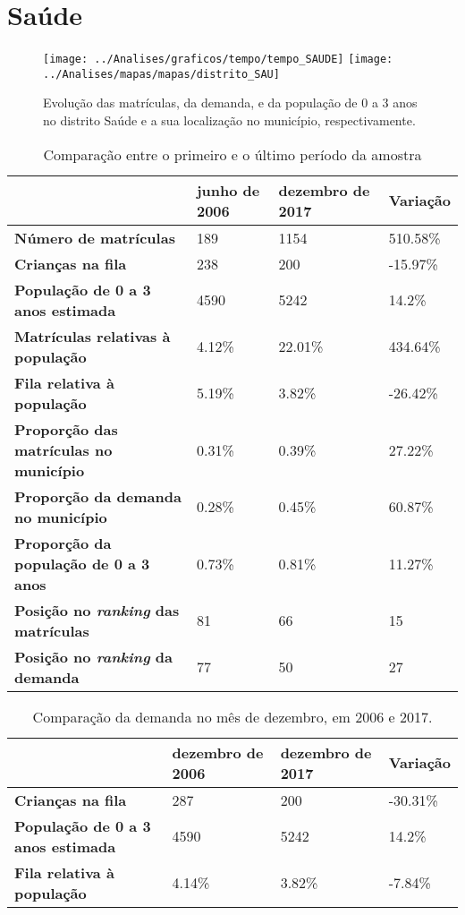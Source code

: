 \section{Saúde}
\begin{figure}[H]
\centering
\texttt{[image: ../Analises/graficos/tempo/tempo\_SAUDE]}
\texttt{[image: ../Analises/mapas/mapas/distrito\_SAU]}
\caption{Evolução das matrículas, da demanda, e da população de 0 a 3 anos no distrito Saúde e a sua localização no município, respectivamente.}
\end{figure}
\begin{table}[H]
\begin{tabular}{l|l|l|l}
\textbf{}                                      & \textbf{junho de 2006}       & \textbf{dezembro de 2017}    & \textbf{Variação} \\ \hline
\textbf{Número de matrículas}                  & 189 & 1154 & 510.58\% \\ \hline
\textbf{Crianças na fila}                      & 238 & 200 & -15.97\% \\ \hline
\textbf{População de 0 a 3 anos estimada}      & 4590 & 5242 & 14.2\% \\ \hline
\textbf{Matrículas relativas à população}      & 4.12\% & 22.01\% & 434.64\% \\ \hline
\textbf{Fila relativa à população}             & 5.19\% & 3.82\% & -26.42\% \\ \hline
\textbf{Proporção das matrículas no município} & 0.31\% & 0.39\% & 27.22\% \\ \hline
\textbf{Proporção da demanda no município}     & 0.28\% & 0.45\% & 60.87\% \\ \hline
\textbf{Proporção da população de 0 a 3 anos}  & 0.73\% & 0.81\% & 11.27\% \\ \hline
\textbf{Posição no \textit{ranking} das matrículas}     & 81 & 66 & 15 \\ \hline
\textbf{Posição no \textit{ranking} da demanda}         & 77 & 50 & 27 \\ 
\end{tabular}
\caption{Comparação entre o primeiro e o último período da amostra}
\end{table}
\begin{table}[H]
\begin{tabular}{l|l|l|l}
\textbf{}                                 & \textbf{dezembro de 2006} & \textbf{dezembro de 2017} & \textbf{Variação} \\ \hline
\textbf{Crianças na fila}                      & 287 & 200 & -30.31\% \\ \hline
\textbf{População de 0 a 3 anos estimada}      & 4590 & 5242 & 14.2\% \\ \hline
\textbf{Fila relativa à população}             & 4.14\% & 3.82\% & -7.84\% \\
\end{tabular}
\caption{Comparação da demanda no mês de dezembro, em 2006 e 2017.}
\end{table}
